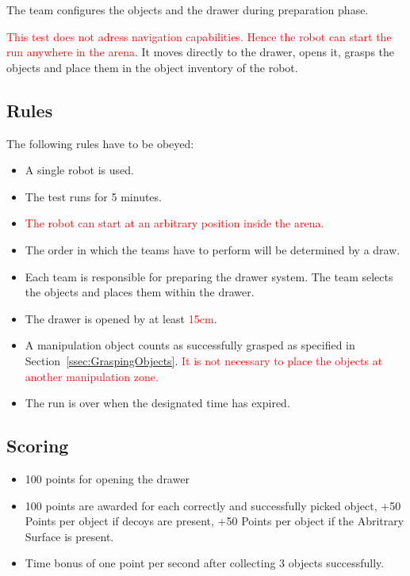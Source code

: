The team configures the objects and the drawer during preparation phase.

\textcolor{red}{This test does not adress navigation capabilities. Hence the robot can start the run anywhere in the arena.} It moves directly to the drawer, opens it, grasps the objects and place them in the object inventory of the robot.

\subsection{Rules}
The following rules have to be obeyed:

\begin{itemize}
\item A single robot is used.
\item The test runs for 5 minutes.
\item \textcolor{red}{The robot can start at an arbitrary position inside the arena.}
\item The order in which the teams have to perform will be determined by a draw.
\item Each team is responsible for preparing the drawer system. The team selects the objects and places them within the drawer.
\item The drawer is opened by at least \textcolor{red}{15cm}.
\item A manipulation object counts as successfully grasped as specified in Section~\ref{ssec:GraspingObjects}. \textcolor{red}{It is not necessary to place the objects at another manipulation zone.}
\item The run is over when the designated time has expired.
\end{itemize}

\subsection{Scoring}
\begin{itemize}
\item 100 points for opening the drawer
\item 100 points are awarded for each correctly and successfully picked object, +50 Points per object if decoys are present, +50 Points per object if the Abritrary Surface is present.
\item Time bonus of one point per second after collecting 3 objects successfully.
\end{itemize}
